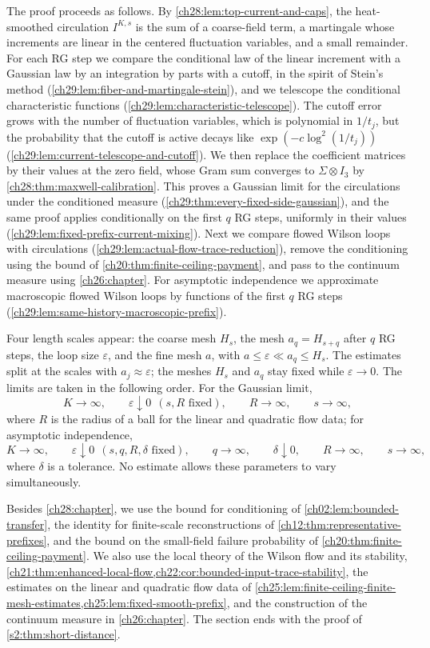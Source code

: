 The proof proceeds as follows. By \cref{ch28:lem:top-current-and-caps}, the heat-smoothed circulation $I^{K,s}$ is the sum of a coarse-field term, a martingale whose increments are linear in the centered fluctuation variables, and a small remainder. For each RG step we compare the conditional law of the linear increment with a Gaussian law by an integration by parts with a cutoff, in the spirit of Stein's method \cite{Stein1972NormalApproximation} (\cref{ch29:lem:fiber-and-martingale-stein}), and we telescope the conditional characteristic functions (\cref{ch29:lem:characteristic-telescope}). The cutoff error grows with the number of fluctuation variables, which is polynomial in $1/t_j$, but the probability that the cutoff is active decays like $\exp(-c\log^2(1/t_j))$ (\cref{ch29:lem:current-telescope-and-cutoff}). We then replace the coefficient matrices by their values at the zero field, whose Gram sum converges to $\Sigma\otimes I_3$ by \cref{ch28:thm:maxwell-calibration}. This proves a Gaussian limit for the circulations under the conditioned measure (\cref{ch29:thm:every-fixed-side-gaussian}), and the same proof applies conditionally on the first $q$ RG steps, uniformly in their values (\cref{ch29:lem:fixed-prefix-current-mixing}). Next we compare flowed Wilson loops with circulations (\cref{ch29:lem:actual-flow-trace-reduction}), remove the conditioning using the bound of \cref{ch20:thm:finite-ceiling-payment}, and pass to the continuum measure using \cref{ch26:chapter}. For asymptotic independence we approximate macroscopic flowed Wilson loops by functions of the first $q$ RG steps (\cref{ch29:lem:same-history-macroscopic-prefix}).

Four length scales appear: the coarse mesh $H_s$, the mesh $a_q=H_{s+q}$ after $q$ RG steps, the loop size $\varepsilon$, and the fine mesh $a$, with $a\le\varepsilon\ll a_q\le H_s$. The estimates split at the scales with $a_j\approx\varepsilon$; the meshes $H_s$ and $a_q$ stay fixed while $\varepsilon\to0$. The limits are taken in the following order. For the Gaussian limit,
\[
 K\to\infty,\qquad\varepsilon\downarrow0\ \ (s,R\text{ fixed}),\qquad R\to\infty,\qquad s\to\infty,
\]
where $R$ is the radius of a ball for the linear and quadratic flow data; for asymptotic independence,
\[
 K\to\infty,\qquad\varepsilon\downarrow0\ \ (s,q,R,\delta\text{ fixed}),\qquad q\to\infty,\qquad\delta\downarrow0,\qquad R\to\infty,\qquad s\to\infty,
\]
where $\delta$ is a tolerance. No estimate allows these parameters to vary simultaneously.

Besides \cref{ch28:chapter}, we use the bound for conditioning of \cref{ch02:lem:bounded-transfer}, the identity for finite-scale reconstructions of \cref{ch12:thm:representative-prefixes}, and the bound on the small-field failure probability of \cref{ch20:thm:finite-ceiling-payment}. We also use the local theory of the Wilson flow and its stability, \cref{ch21:thm:enhanced-local-flow,ch22:cor:bounded-input-trace-stability}, the estimates on the linear and quadratic flow data of \cref{ch25:lem:finite-ceiling-finite-mesh-estimates,ch25:lem:fixed-smooth-prefix}, and the construction of the continuum measure in \cref{ch26:chapter}. The section ends with the proof of \cref{s2:thm:short-distance}.

